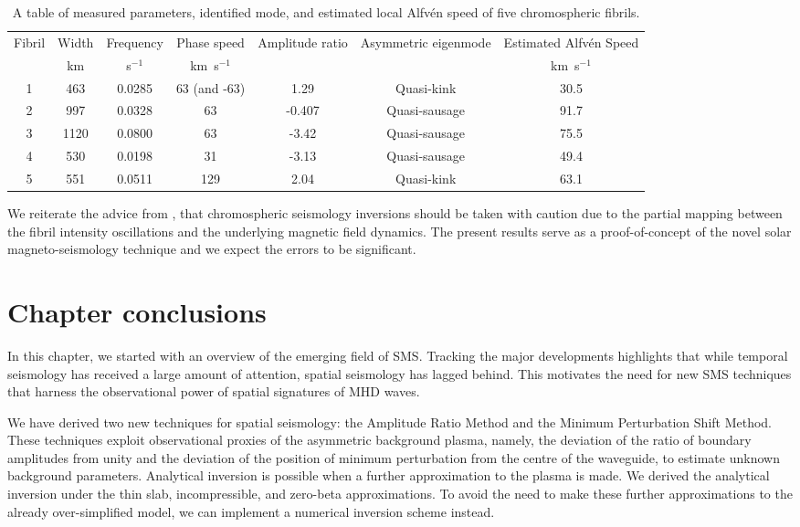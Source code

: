 \begin{sidewaystable}
	\centering
	\caption{A table of measured parameters, identified mode, and estimated local Alfv\'{e}n speed of five chromospheric fibrils.}
	\begin{tabular}{ccccccc}
		\toprule
		Fibril & Width & Frequency & Phase speed & Amplitude ratio & Asymmetric eigenmode & Estimated Alfv\'{e}n Speed \\
		& km & s$^{-1}$ & km~s$^{-1}$ & & & km~s$^{-1}$ \\
		\midrule
		1 & 463 & 0.0285 & 63 (and -63) & 1.29 & Quasi-kink & 30.5 \\
		2 & 997 & 0.0328 & 63 & -0.407 & Quasi-sausage & 91.7 \\
		3 & 1120 & 0.0800 & 63 & -3.42 & Quasi-sausage & 75.5 \\
		4 & 530 & 0.0198 & 31 & -3.13 & Quasi-sausage & 49.4 \\
		5 & 551 & 0.0511 & 129 & 2.04 & Quasi-kink & 63.1 \\
		\bottomrule
	\end{tabular} \label{table: fibril inversion}
\end{sidewaystable}

We reiterate the advice from \cite{lee_etal15}, that chromospheric seismology inversions should be taken with caution due to the partial mapping between the fibril intensity oscillations and the underlying magnetic field dynamics. The present results serve as a proof-of-concept of the novel solar magneto-seismology technique and we expect the errors to be significant.


\section{Chapter conclusions}
\label{sec: chpt 4 conc}

In this chapter, we started with an overview of the emerging field of SMS. Tracking the major developments highlights that while temporal seismology has received a large amount of attention, spatial seismology has lagged behind. This motivates the need for new SMS techniques that harness the observational power of spatial signatures of MHD waves.

We have derived two new techniques for spatial seismology: the Amplitude Ratio Method and the Minimum Perturbation Shift Method. These techniques exploit observational proxies of the asymmetric background plasma, namely, the deviation of the ratio of boundary amplitudes from unity and the deviation of the position of minimum perturbation from the centre of the waveguide, to estimate unknown background parameters. Analytical inversion is possible when a further approximation to the plasma is made. We derived the analytical inversion under the thin slab, incompressible, and zero-beta approximations. To avoid the need to make these further approximations to the already over-simplified model, we can implement a numerical inversion scheme instead. 

